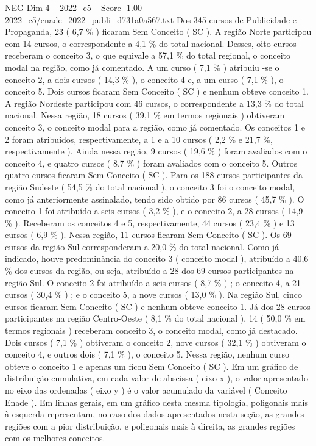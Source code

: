 \begin{textsample}{NEG Dim 4 – 2022\_c5 – Score -1.00 – 2022\_c5/enade\_2022\_publi\_d731a0a567.txt}
Dos 345 cursos de Publicidade e Propaganda, 23 ( 6,7 \% ) ficaram Sem Conceito ( SC ).
A região Norte participou com 14 cursos, o correspondente a 4,1 \% do total nacional.
Desses, oito cursos receberam o conceito 3, o que equivale a 57,1 \% do total regional, o conceito modal na região, como já comentado.
A um curso ( 7,1 \% ) atribuiu -se o conceito 2, a dois cursos ( 14,3 \% ), o conceito 4 e, a um curso ( 7,1 \% ), o conceito 5.
Dois cursos ficaram Sem Conceito ( SC ) e nenhum obteve conceito 1.
A região Nordeste participou com 46 cursos, o correspondente a 13,3 \% do total nacional.
Nessa região, 18 cursos ( 39,1 \% em termos regionais ) obtiveram conceito 3, o conceito modal para a região, como já comentado.
Os conceitos 1 e 2 foram atribuídos, respectivamente, a 1 e a 10 cursos ( 2,2 \% e 21,7 \%, respectivamente ).
Ainda nessa região, 9 cursos ( 19,6 \% ) foram avaliados com o conceito 4, e quatro cursos ( 8,7 \% ) foram avaliados com o conceito 5.
Outros quatro cursos ficaram Sem Conceito ( SC ).
Para os 188 cursos participantes da região Sudeste ( 54,5 \% do total nacional ), o conceito 3 foi o conceito modal, como já anteriormente assinalado, tendo sido obtido por 86 cursos ( 45,7 \% ).
O conceito 1 foi atribuído a seis cursos ( 3,2 \% ), e o conceito 2, a 28 cursos ( 14,9 \% ).
Receberam os conceitos 4 e 5, respectivamente, 44 cursos ( 23,4 \% ) e 13 cursos ( 6,9 \% ).
Nessa região, 11 cursos ficaram Sem Conceito ( SC ).
Os 69 cursos da região Sul corresponderam a 20,0 \% do total nacional.
Como já indicado, houve predominância do conceito 3 ( conceito modal ), atribuído a 40,6 \% dos cursos da região, ou seja, atribuído a 28 dos 69 cursos participantes na região Sul.
O conceito 2 foi atribuído a seis cursos ( 8,7 \% ) ; o conceito 4, a 21 cursos ( 30,4 \% ) ; e o conceito 5, a nove cursos ( 13,0 \% ).
Na região Sul, cinco cursos ficaram Sem Conceito ( SC ) e nenhum obteve conceito 1.
Já dos 28 cursos participantes na região Centro-Oeste ( 8,1 \% do total nacional ), 14 ( 50,0 \% em termos regionais ) receberam conceito 3, o conceito modal, como já destacado.
Dois cursos ( 7,1 \% ) obtiveram o conceito 2, nove cursos ( 32,1 \% ) obtiveram o conceito 4, e outros dois ( 7,1 \% ), o conceito 5.
Nessa região, nenhum curso obteve o conceito 1 e apenas um ficou Sem Conceito ( SC ).
Em um gráfico de distribuição cumulativa, em cada valor de abscissa ( eixo x ), o valor apresentado no eixo das ordenadas ( eixo y ) é o valor acumulado da variável ( Conceito Enade ).
Em linhas gerais, em um gráfico desta mesma tipologia, poligonais mais à esquerda representam, no caso dos dados apresentados nesta seção, as grandes regiões com a pior distribuição, e poligonais mais à direita, as grandes regiões com os melhores conceitos.

\end{textsample}

